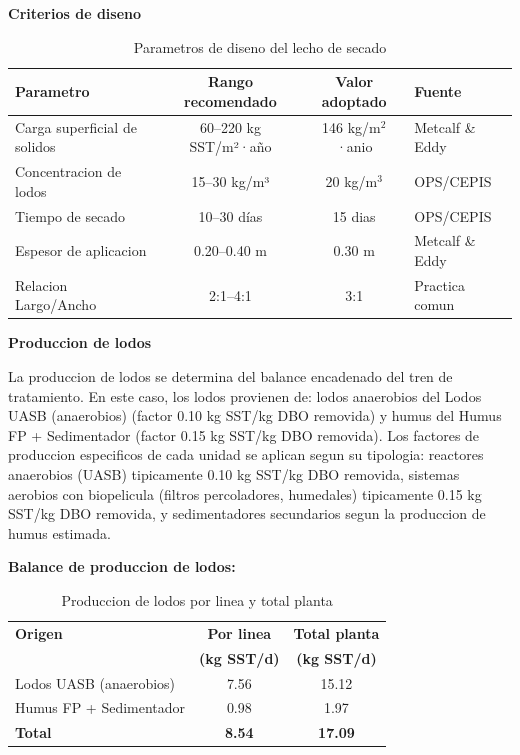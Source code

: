 \textbf{Criterios de diseno}

\begin{table}[H]
\centering
\caption{Parametros de diseno del lecho de secado}
\small
\begin{tabular}{lccl}
\toprule
Parametro & Rango recomendado & Valor adoptado & Fuente \\
\midrule
Carga superficial de solidos & 60--220 kg SST/m²·año & 146 kg/m$^2$·anio & Metcalf \& Eddy \cite{metcalf2014} \\
Concentracion de lodos & 15--30 kg/m³ & 20 kg/m$^3$ & OPS/CEPIS \cite{ops2005} \\
Tiempo de secado & 10--30 días & 15 dias & OPS/CEPIS \\
Espesor de aplicacion & 0.20--0.40 m & 0.30 m & Metcalf \& Eddy \\
Relacion Largo/Ancho & 2:1--4:1 & 3:1 & Practica comun \\
\bottomrule
\end{tabular}
\end{table}

\textbf{Produccion de lodos}

La produccion de lodos se determina del balance encadenado del tren de tratamiento. En este caso, los lodos provienen de: lodos anaerobios del Lodos UASB (anaerobios) (factor 0.10 kg SST/kg DBO removida) y humus del Humus FP + Sedimentador (factor 0.15 kg SST/kg DBO removida). Los factores de produccion especificos de cada unidad se aplican segun su tipologia: reactores anaerobios (UASB) tipicamente 0.10 kg SST/kg DBO removida, sistemas aerobios con biopelicula (filtros percoladores, humedales) tipicamente 0.15 kg SST/kg DBO removida, y sedimentadores secundarios segun la produccion de humus estimada.

\textbf{Balance de produccion de lodos:}

\begin{table}[H]
\centering
\small
\caption{Produccion de lodos por linea y total planta}
\begin{tabular}{p{6cm}cc}
\toprule
\textbf{Origen} & \textbf{Por linea} & \textbf{Total planta} \\
 & \textbf{(kg SST/d)} & \textbf{(kg SST/d)} \\
\midrule
Lodos UASB (anaerobios) & 7.56 & 15.12 \\
Humus FP + Sedimentador & 0.98 & 1.97 \\
\midrule
\textbf{Total} & \textbf{8.54} & \textbf{17.09} \\
\bottomrule
\end{tabular}
\end{table}

